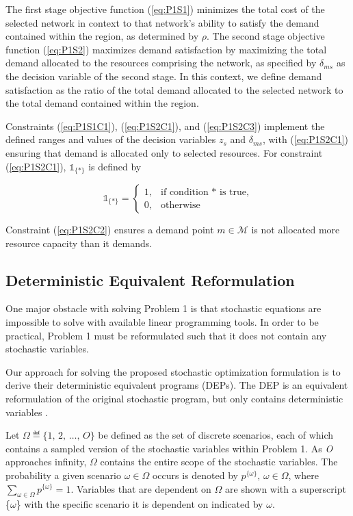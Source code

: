 \documentclass[onecolumn,draftcls]{IEEEtran}
\begin{document}
The first stage objective function (\ref{eq:P1S1}) minimizes the total cost of the selected network in context to that network's ability to satisfy the demand contained within the region, as determined by $\rho$.  The second stage objective function (\ref{eq:P1S2}) maximizes demand satisfaction by maximizing the total demand allocated to the resources comprising the network, as specified by $\delta_{ms}$ as the decision variable of the second stage.  In this context, we define demand satisfaction as the ratio of the total demand allocated to the selected network to the total demand contained within the region.

Constraints (\ref{eq:P1S1C1}), (\ref{eq:P1S2C1}), and (\ref{eq:P1S2C3}) implement the defined ranges and values of the decision variables $z_s$ and $\delta_{ms}$, with (\ref{eq:P1S2C1}) ensuring that demand is allocated only to selected resources.  For constraint (\ref{eq:P1S2C1}), $\mathbb{1}_{\{*\}}$ is defined by

\[ \mathbb{1}_{\{*\}} =
	\begin{cases}
		1,& \text{if condition $*$ is true,}\\
		0,& \text{otherwise}
	\end{cases}
\]

Constraint (\ref{eq:P1S2C2}) ensures a demand point $m \in \mathcal{M}$ is not allocated more resource capacity than it demands.

\subsection{Deterministic Equivalent Reformulation} \label{subsec:dep}

One major obstacle with solving Problem 1 is that stochastic equations are impossible to solve with available linear programming tools.  In order to be practical, Problem 1 must be reformulated such that it does not contain any stochastic variables.

Our approach for solving the proposed stochastic optimization formulation is to derive their deterministic equivalent programs (DEPs).  The DEP is an equivalent reformulation of the original stochastic program, but only contains deterministic variables \cite{stochprogramming}.

Let $ \Omega \eqdef \{1,\, 2,\, \ldots,\, O\} $ be defined as the set of discrete scenarios, each of which contains a sampled version of the stochastic variables within Problem 1.  As \textit{O} approaches infinity, $\Omega$ contains the entire scope of the stochastic variables.  The probability a given scenario $\omega \in \Omega$ occurs is denoted by $p^{\{\omega\}},\, \omega \in \Omega$, where $\sum_{\omega \in \Omega} p^{\{\omega\}} = 1$.  Variables that are dependent on $\Omega$ are shown with a superscript \{$\omega$\} with the specific scenario it is dependent on indicated by $\omega$.
\end{document}
